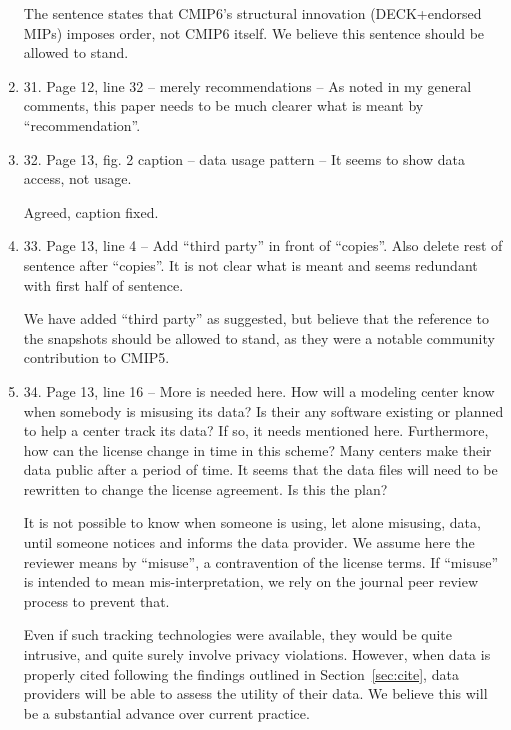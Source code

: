 \documentclass[gmd,manuscript]{copernicus}
\newenvironment{answer}{\color{blue}}{}
\begin{document}
\begin{enumerate}[label=RC1-\arabic*,leftmargin=*]
  \begin{answer}
    The sentence states that CMIP6's structural innovation
    (DECK+endorsed MIPs) imposes order, not CMIP6 itself. We believe
    this sentence should be allowed to stand.
  \end{answer}
\item 31. Page 12, line 32 -- merely recommendations -- As noted in my
  general comments, this paper needs to be much clearer what is meant
  by “recommendation”.
\item 32. Page 13, fig. 2 caption -- data usage pattern -- It seems to
  show data access, not usage.

  \begin{answer}
    Agreed, caption fixed.
  \end{answer}
\item 33. Page 13, line 4 -- Add “third party” in front of “copies”.
  Also delete rest of sentence after “copies”. It is not clear what is
  meant and seems redundant with first half of sentence.

  \begin{answer}
    We have added ``third party'' as suggested, but believe that the
    reference to the snapshots should be allowed to stand, as they
    were a notable community contribution to CMIP5.
  \end{answer}
\item 34. Page 13, line 16 -- More is needed here. How will a modeling
  center know when somebody is misusing its data? Is their any
  software existing or planned to help a center track its data? If so,
  it needs mentioned here. Furthermore, how can the license change in
  time in this scheme? Many centers make their data public after a
  period of time. It seems that the data files will need to be
  rewritten to change the license agreement. Is this the plan?

  \begin{answer}
    It is not possible to know when someone is using, let alone
    misusing, data, until someone notices and informs the data
    provider. We assume here the reviewer means by ``misuse'', a
    contravention of the license terms. If ``misuse'' is intended to
    mean mis-interpretation, we rely on the journal peer review
    process to prevent that.

    Even if such tracking technologies were available, they would be
    quite intrusive, and quite surely involve privacy violations.
    However, when data is properly cited following the findings
    outlined in Section~\ref{sec:cite}, data providers will be able to
    assess the utility of their data. We believe this will be a
    substantial advance over current practice.


\end{answer}
\end{enumerate}
\end{document}
